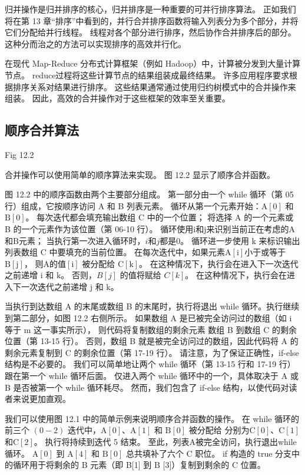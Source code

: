 归并操作是归并排序的核心，归并排序是一种重要的可并行排序算法。 
正如我们将在第 13 章“排序”中看到的，并行合并排序函数将输入列表分为多个部分，并将它们分配给并行线程。 
线程对各个部分进行排序，然后协作合并排序后的部分。 这种分而治之的方法可以实现排序的高效并行化。

在现代 Map-Reduce 分布式计算框架（例如 Hadoop）中，计算被分发到大量计算节点。 
reduce过程将这些计算节点的结果组装成最终结果。 许多应用程序要求根据排序关系对结果进行排序。 
这些结果通常通过使用归约树模式中的合并操作来组装。 因此，高效的合并操作对于这些框架的效率至关重要。

\subsection{顺序合并算法}
{\color{red} Fig 12.2}

合并操作可以使用简单的顺序算法来实现。 图 12.2 显示了顺序合并函数。

图 12.2 中的顺序函数由两个主要部分组成。 第一部分由一个 while 循环（第 05 行）组成，它按顺序访问 A 和 B 列表元素。 
循环从第一个元素开始：$\mathrm{A}[0]$ 和 $\mathrm{B}[0]$。 
每次迭代都会填充输出数组 C 中的一个位置； 将选择 A 的一个元素或 B 的一个元素作为该位置（第 06-10 行）。 
循环使用$\mathrm{i}$和$\mathrm{j}$来识别当前正在考虑的A和$\mathrm{B}$元素； 当执行第一次进入循环时，$i$和$j$都是0。 
循环进一步使用 $\mathrm{k}$ 来标识输出列表数组 $\mathrm{C}$ 中要填充的当前位置。 
在每次迭代中，如果元素$\mathrm{A}[\mathrm{i}]$小于或等于$\mathrm{B}[\mathrm{j}]$，
则$\mathrm{A}的值 [\mathrm{i}]$ 被分配给 $\mathrm{C}[\mathrm{k}]$。 
在这种情况下，执行会在进入下一次迭代之前递增 $\mathrm{i}$ 和 $\mathrm{k}$。 
否则，$B[j]$ 的值将赋给 $C[k]$。 在这种情况下，执行会在进入下一次迭代之前递增 $\mathrm{j}$ 和 $\mathrm{k}$。

当执行到达数组 A 的末尾或数组 B 的末尾时，执行将退出 while 循环。执行继续到第二部分，如图 12.2 右侧所示。 
如果数组 $\mathrm{A}$ 是已被完全访问过的数组（如 $\mathrm{i}$ 等于 $\mathrm{m}$ 这一事实所示），
则代码将复制数组的剩余元素 数组 B 到数组 C 的剩余位置（第 13-15 行）。 
否则，数组 B 就是被完全访问过的数组，因此代码将 A 的剩余元素复制到 C 的剩余位置（第 17-19 行）。 
请注意，为了保证正确性，if-else 结构是不必要的。 
我们可以简单地让两个 while 循环（第 13-15 行和 17-19 行）跟在第一个 while 循环后面。 
仅进入两个 while 循环中的一个，具体取决于 A 或 B 是否被第一个 while 循环耗尽。 
然而，我们包含了 if-else 结构，以使代码对读者来说更加直观。

我们可以使用图 12.1 中的简单示例来说明顺序合并函数的操作。 
在 while 循环的前三个 $(0-2)$ 迭代中，$\mathrm{A}[0]、\mathrm{A}[1]$ 和 $\mathrm{B}[0]$ 被分配给 分别为$\mathrm{C}[0]、\mathrm{C}[1]$和$\mathrm{C}[2]$。 执行将持续到迭代 5 结束。 
至此，列表$\mathrm{A}$被完全访问，执行退出while循环。 
$\mathrm{A}[0]$ 到 $\mathrm{A}[4]$ 和 $\mathrm{B}[0]$ 总共填补了六个 $\mathrm{C}$ 职位。 
if 构造的 true 分支中的循环用于将剩余的 B 元素（即 B[1] 到 $\mathrm{B}$ [3]）复制到剩余的 $\mathrm{C}$ 位置。


